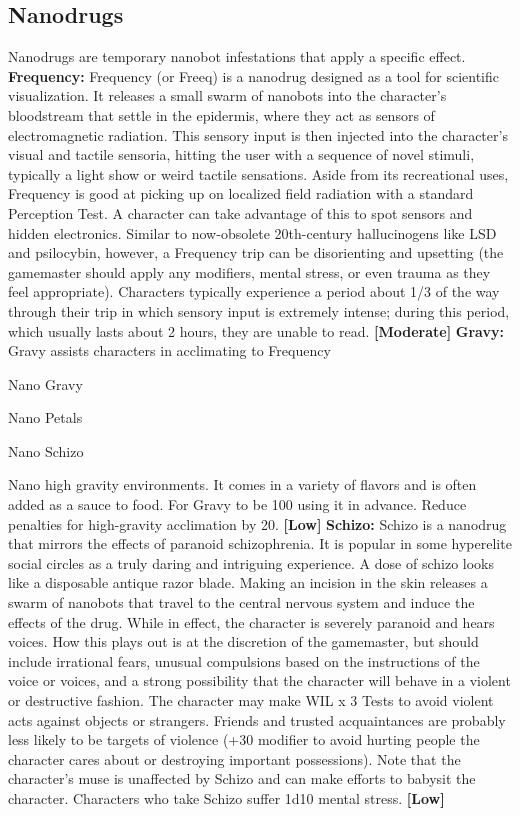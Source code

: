 \subsection{Nanodrugs}

Nanodrugs are temporary nanobot infestations that 
apply a specific effect.
\textbf{Frequency:} Frequency (or Freeq) is a nanodrug designed
as a tool for scientific visualization. It releases
a small swarm of nanobots into the character's bloodstream
that settle in the epidermis, where they act as
sensors of electromagnetic radiation. This sensory 
input is then injected into the character's visual and 
tactile sensoria, hitting the user with a sequence of 
novel stimuli, typically a light show or weird tactile 
sensations. Aside from its recreational uses, Frequency 
is good at picking up on localized field radiation with 
a standard Perception Test. A character can take advantage
of this to spot sensors and hidden electronics.
Similar to now-obsolete 20th-century hallucinogens 
like LSD and psilocybin, however, a Frequency trip 
can be disorienting and upsetting (the gamemaster 
should apply any modifiers, mental stress, or even 
trauma as they feel appropriate). Characters typically 
experience a period about 1/3 of the way through 
their trip in which sensory input is extremely intense; 
during this period, which usually lasts about 2 hours, 
they are unable to read. \textbf{[Moderate]}
\textbf{Gravy:} Gravy assists characters in acclimating to 
Frequency

Nano
Gravy

Nano
Petals

Nano
Schizo

Nano
high gravity environments. It comes in a variety of 
flavors and is often added as a sauce to food. For 
Gravy to be 100%
using it in advance. Reduce penalties for high-gravity 
acclimation by 20. \textbf{[Low]}
\textbf{Schizo:} Schizo is a nanodrug that mirrors the effects
of paranoid schizophrenia. It is popular in
some hyperelite social circles as a truly daring and 
intriguing experience. A dose of schizo looks like a 
disposable antique razor blade. Making an incision 
in the skin releases a swarm of nanobots that travel 
to the central nervous system and induce the effects 
of the drug. While in effect, the character is severely 
paranoid and hears voices. How this plays out is at 
the discretion of the gamemaster, but should include 
irrational fears, unusual compulsions based on the 
instructions of the voice or voices, and a strong possibility
that the character will behave in a violent or
destructive fashion. The character may make WIL x 3 
Tests to avoid violent acts against objects or strangers. 
Friends and trusted acquaintances are probably less 
likely to be targets of violence (+30 modifier to avoid 
hurting people the character cares about or destroying
important possessions). Note that the character's
muse is unaffected by Schizo and can make efforts 
to babysit the character. Characters who take Schizo 
suffer 1d10 mental stress. \textbf{[Low]}

